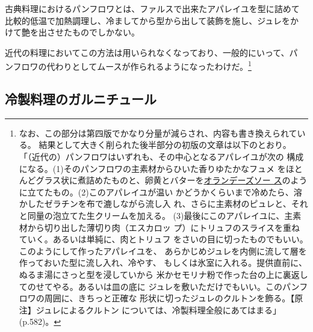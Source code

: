 

古典料理におけるパンフロワとは、ファルスで出来たアパレイユを型に詰めて
比較的低温で加熱調理し、冷ましてから型から出して装飾を施し、ジュレをか
けて艶を出させたものでしかない。

近代の料理においてこの方法は用いられなくなっており、一般的にいって、パ
ンフロワの代わりとしてムースが作られるようになったわけだ。\footnote{なお、この部分は第四版でかなり分量が減らされ、内容も書き換えられている。
  結果として大きく削られた後半部分の初版の文章は以下のとおり。
  「（近代の）パンフロワはいずれも、その中心となるアパレイユが次の
  構成になる。(1)そのパンフロワの主素材からひいた香りゆたかなフュメ
  をほとんどグラス状に煮詰めたものと、卵黄とバターを\protect\hyperlink{sauce-hollandaise}{オランデーズソー
  ス}のように立てたもの。(2)このアパレイユが温い
  かどうかくらいまで冷めたら、溶かしたゼラチンを布で漉しながら流し入
  れ、さらに主素材のピュレと、それと同量の泡立てた生クリームを加える。
  (3)最後にこのアパレイユに、主素材から切り出した薄切り肉（エスカロッ
  プ）にトリュフのスライスを重ねていく。あるいは単純に、肉とトリュフ
  をさいの目に切ったものでもいい。このようにして作ったアパレイユを、
  あらかじめジュレを内側に流して層を作っておいた型に流し入れ、冷やす、
  もしくは氷室に入れる。提供直前に、ぬるま湯にさっと型を浸していから
  米かセモリナ粉で作った台の上に裏返してのせてやる。あるいは皿の底に
  ジュレを敷いただけでもいい。このパンフロワの周囲に、きちっと正確な
  形状に切ったジュレのクルトンを飾る。【原注】ジュレによるクルトン
  については、冷製料理全般にあてはまる」(p.582)。}

\hypertarget{garnitures-de-mets-froids}{%
\subsection{冷製料理のガルニチュール}\label{garnitures-de-mets-froids}}


